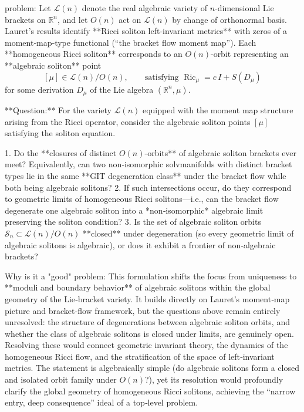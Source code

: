 problem:  
Let \( \mathcal{L}(n) \) denote the real algebraic variety of \(n\)-dimensional Lie brackets on \(\mathbb{R}^n\), and let \(O(n)\) act on \(\mathcal{L}(n)\) by change of orthonormal basis.  Lauret’s results identify **Ricci soliton left‑invariant metrics** with zeros of a moment‑map‑type functional (“the bracket flow moment map”).  Each **homogeneous Ricci soliton** corresponds to an \(O(n)\)-orbit representing an **algebraic soliton** point
\[
[\mu]\in \mathcal{L}(n)/O(n),\qquad \text{satisfying } \operatorname{Ric}_\mu = c\,I + S(D_\mu)
\]
for some derivation \(D_\mu\) of the Lie algebra \((\mathbb{R}^n,\mu)\).  

**Question:**  
For the variety \( \mathcal{L}(n) \) equipped with the moment map structure arising from the Ricci operator, consider the algebraic soliton points \([\mu]\) satisfying the soliton equation.  

1.  Do the **closures of distinct \(O(n)\)-orbits** of algebraic soliton brackets ever meet?  Equivalently, can two non‑isomorphic solvmanifolds with distinct bracket types lie in the same **GIT degeneration class** under the bracket flow while both being algebraic solitons?  
2.  If such intersections occur, do they correspond to geometric limits of homogeneous Ricci solitons—i.e., can the bracket flow degenerate one algebraic soliton into a *non‑isomorphic* algebraic limit preserving the soliton condition?  
3.  Is the set of algebraic soliton orbits \( \mathcal{S}_n \subset \mathcal{L}(n)/O(n) \) **closed** under degeneration (so every geometric limit of algebraic solitons is algebraic), or does it exhibit a frontier of non‑algebraic brackets?  

Why is it a "good" problem:  
This formulation shifts the focus from uniqueness to **moduli and boundary behavior** of algebraic solitons within the global geometry of the Lie‑bracket variety.  It builds directly on Lauret’s moment‑map picture and bracket‑flow framework, but the questions above remain entirely unresolved: the structure of degenerations between algebraic soliton orbits, and whether the class of algebraic solitons is closed under limits, are genuinely open.  Resolving these would connect geometric invariant theory, the dynamics of the homogeneous Ricci flow, and the stratification of the space of left‑invariant metrics.  The statement is algebraically simple (do algebraic solitons form a closed and isolated orbit family under \(O(n)\)?), yet its resolution would profoundly clarify the global geometry of homogeneous Ricci solitons, achieving the “narrow entry, deep consequence” ideal of a top‑level problem.